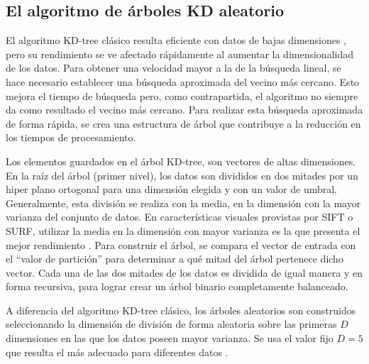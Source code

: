 \subsection{El algoritmo de árboles KD aleatorio}
El algoritmo KD-tree clásico resulta eficiente con datos de bajas dimensiones \cite{Friedman:1977:AFB:355744.355745}, pero su rendimiento se ve afectado rápidamente al aumentar la dimensionalidad de los datos. 
Para obtener una velocidad mayor a la de la búsqueda lineal, se hace necesario establecer una búsqueda aproximada del vecino más cercano. Esto mejora el tiempo de búsqueda pero, como contrapartida, el algoritmo no siempre da como resultado el vecino más cercano. Para realizar esta búsqueda aproximada de forma rápida, se crea una estructura de árbol que contribuye a la reducción en los tiempos de procesamiento.%

Los elementos guardados en el árbol KD-tree, son vectores de altas dimensiones. En la raíz del árbol (primer nivel), los datos son divididos en dos mitades por un hiper plano ortogonal para una dimensión elegida y con un valor de umbral. Generalmente, esta división se realiza con la media, en la dimensión con la mayor varianza del conjunto de datos. En características visuales provistas por SIFT o SURF, utilizar la media en la dimensión con mayor varianza es la que presenta el mejor rendimiento \cite{muja_flann_2009}. Para construir el árbol, se compara el vector de entrada con el ``valor de partición'' para determinar a qué mitad del árbol pertenece dicho vector.
Cada una de las dos mitades de los datos es dividida de igual manera y en forma recursiva, para lograr crear un árbol binario completamente balanceado.

A diferencia del algoritmo KD-tree clásico, los árboles aleatorios son construidos seleccionando la dimensión de división de forma aleatoria sobre las primeras $D$ dimensiones en las que los datos poseen mayor varianza. 
Se usa el valor fijo $D=5$ que resulta el más adecuado para diferentes datos \cite{muja_flann_2009}. %

